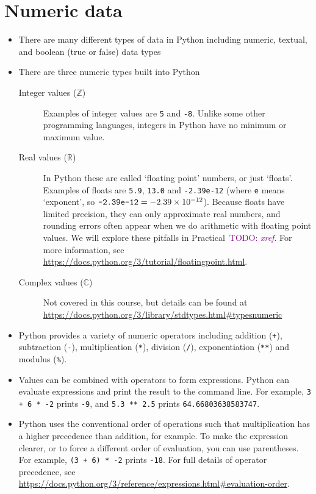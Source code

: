 \documentclass[a4paper,twoside,titlepage]{memoir}
\newcommand{\shellcmd}{\texttt}
\newcommand{\TODO}[1]{\textcolor{purple}{TODO: \emph{#1}}}
\begin{document}
\section{Numeric data}
\begin{itemize}
\item There are many different types of data in Python including numeric, textual, and boolean (true or false) data types
\item There are three numeric types built into Python
	\begin{description}
	\item[Integer values ($\mathbb{Z}$)]{Examples of integer values are \shellcmd{5} and \shellcmd{-8}.  Unlike some other programming languages, integers in Python have no minimum or maximum value.}
	\item[Real values ($\mathbb{R}$)]{In Python these are called `floating point' numbers, or just `floats'.  Examples of floats are \shellcmd{5.9}, \shellcmd{13.0} and \shellcmd{-2.39e-12} (where \shellcmd{e} means `exponent', so $\text{\shellcmd{-2.39e-12}} = \num{-2.39e-12}$).  Because floats have limited precision, they can only approximate real numbers, and rounding errors often appear when we do arithmetic with floating point values.  We will explore these pitfalls in Practical~\TODO{xref}.  For more information, see \url{https://docs.python.org/3/tutorial/floatingpoint.html}.}
	\item[Complex values ($\mathbb{C}$)]{Not covered in this course, but details can be found at \url{https://docs.python.org/3/library/stdtypes.html#typesnumeric}}
	\end{description}
\item Python provides a variety of numeric operators including addition (\shellcmd{+}), subtraction (\shellcmd{-}), multiplication (\shellcmd{*}), division (\shellcmd{/}), exponentiation (\shellcmd{**}) and modulus (\shellcmd{\%}).
\item Values can be combined with operators to form expressions.  Python can evaluate expressions and print the result to the command line.  For example, \shellcmd{3 + 6 * -2} prints \shellcmd{-9}, and \shellcmd{5.3 ** 2.5} prints \shellcmd{64.66803638583747}.
\item Python uses the conventional order of operations such that multiplication has a higher precedence than addition, for example.  To make the expression clearer, or to force a different order of evaluation, you can use parentheses.  For example, \shellcmd{(3 + 6) * -2} prints \shellcmd{-18}.  For full details of operator precedence, see \url{https://docs.python.org/3/reference/expressions.html#evaluation-order}.
\end{itemize}
\end{document}
